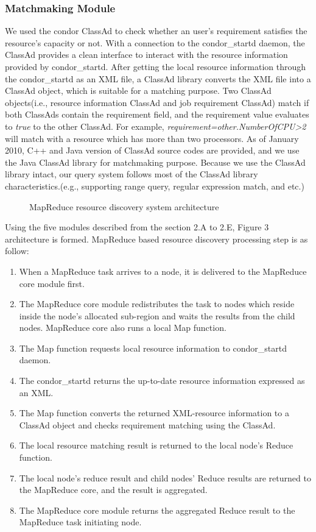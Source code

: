 \documentclass{acm_proc_article-sp}
\begin{document}
\subsubsection{Matchmaking Module}
We used the condor ClassAd\cite{classad} to check whether an user's requirement satisfies the resource's capacity or not. 
With a connection to the condor\_startd daemon, the ClassAd provides a clean interface to interact with the resource information provided by condor\_startd. 
After getting the local resource information through the condor\_startd as an XML file, a ClassAd library converts the XML file into a ClassAd object, which is suitable for a matching purpose.
Two ClassAd objects(i.e., resource information ClassAd and job requirement ClassAd) match if both ClassAds contain the requirement field, and the requirement value evaluates to \textit{true} to the other ClassAd. 
For example, \textit{requirement=other.NumberOfCPU>2} will match with a resource which has more than two processors.
As of January 2010, C++ and Java version of ClassAd source codes are provided, and we use the Java ClassAd library for matchmaking purpose. 
Because we use the ClassAd library intact, our query system follows most of the ClassAd library characteristics.(e.g., supporting range query, regular expression match, and etc.)
\begin{figure}
\centering
{}
\caption{MapReduce resource discovery system architecture}
\end{figure}

Using the five modules described from the section 2.A to 2.E, Figure 3 architecture is formed. MapReduce based resource discovery processing step is as follow:
\begin{enumerate}
\setlength{\itemsep}{0pt}
\setlength{\parskip}{0pt}
\item When a MapReduce task arrives to a node, it is delivered to the MapReduce core module first.
\item The MapReduce core module redistributes the task to nodes which reside inside the node's allocated sub-region and waits the results from the child nodes. MapReduce core also runs a local Map function.
\item The Map function requests local resource information to condor\_startd daemon.
\item The condor\_startd returns the up-to-date resource information expressed as an XML.
\item The Map function converts the returned XML-resource information to a ClassAd object and checks requirement matching using the ClassAd.
\item The local resource matching result is returned to the local node's Reduce function.
\item The local node's reduce result and child nodes' Reduce results are returned to the MapReduce core, and the result is aggregated.
\item The MapReduce core module returns the aggregated Reduce result to the MapReduce task initiating node.
\end{enumerate}
\end{document}
